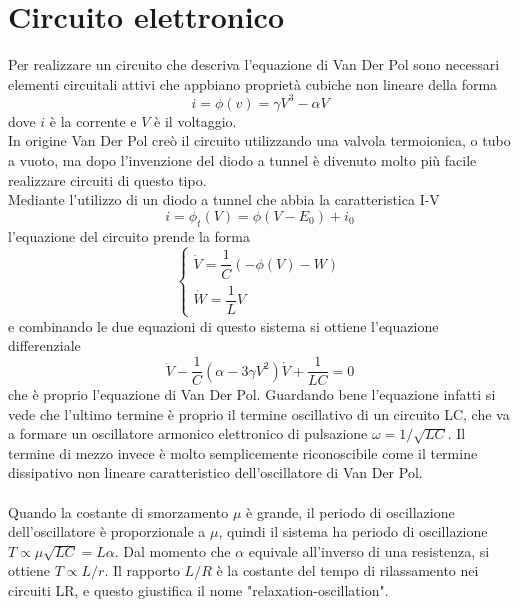 \documentclass[12pt]{article}
\begin{document}
\section{Circuito elettronico}
Per realizzare un circuito che descriva l'equazione di Van Der Pol sono necessari elementi circuitali attivi che appbiano proprietà cubiche non lineare della forma
\begin{equation}
	i = \phi(v) = \gamma V^3 - \alpha V
\end{equation}
dove $i$ è la corrente e $V$ è il voltaggio. \\
In origine Van Der Pol creò il circuito utilizzando una valvola termoionica, o tubo a vuoto, ma dopo l'invenzione del diodo a tunnel è divenuto molto più facile realizzare circuiti di questo tipo. \\
Mediante l'utilizzo di un diodo a tunnel che abbia la caratteristica I-V
\begin{equation}
	i = \phi_t(V) = \phi(V - E_0) + i_0
\end{equation}
l'equazione del circuito prende la forma
\begin{equation}
	\begin{cases}
		\dot{V} = \dfrac{1}{C}\left(-\phi(V) - W\right) \\
		\dot{W} = \dfrac{1}{L}V
	\end{cases} 
\end{equation}
e combinando le due equazioni di questo sistema si ottiene l'equazione differenziale
\begin{equation}
	\ddot{V}-\frac{1}{C}\left( \alpha - 3\gamma  V^2\right)\dot{V} + \frac{1}{LC} = 0
\end{equation}
che è proprio l'equazione di Van Der Pol. Guardando bene l'equazione infatti si vede che l'ultimo termine è proprio il termine oscillativo di un circuito LC, che va a formare un oscillatore armonico elettronico di pulsazione $\omega = 1/\sqrt{LC}$. Il termine di mezzo invece è molto semplicemente riconoscibile come il termine dissipativo non lineare caratteristico dell'oscillatore di Van Der Pol. \\ \\
Quando la costante di smorzamento $\mu$ è grande, il periodo di oscillazione dell'oscillatore è proporzionale a $\mu$, quindi il sistema ha periodo di oscillazione $T \propto \mu\sqrt{LC} = L\alpha$. Dal momento che $\alpha$ equivale all'inverso di una resistenza, si ottiene $T \propto L/r$. Il rapporto $L/R$ è la costante del tempo di rilassamento nei circuiti LR, e questo giustifica il nome "relaxation-oscillation". 
\end{document}

